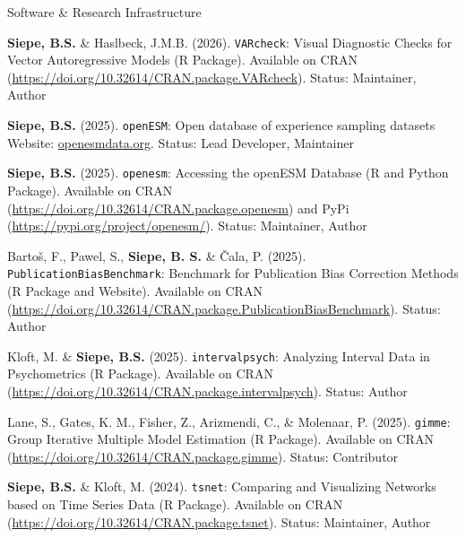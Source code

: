 \documentclass{resume} %
\begin{document}
\begin{rSection}{Software \& Research Infrastructure}
\begin{etaremune}

\item \textbf{Siepe, B.S.}  \& Haslbeck, J.M.B. (2026). \texttt{VARcheck}: Visual Diagnostic Checks for Vector Autoregressive Models (R Package). Available on CRAN (\url{https://doi.org/10.32614/CRAN.package.VARcheck}). Status: Maintainer, Author

\item \textbf{Siepe, B.S.} (2025). \texttt{openESM}: Open database of experience sampling datasets\\  Website: \href{https://openesmdata.org}{openesmdata.org}. Status: Lead Developer, Maintainer

\item \textbf{Siepe, B.S.} (2025). \texttt{openesm}: Accessing the openESM Database (R and Python Package). Available on CRAN (\url{https://doi.org/10.32614/CRAN.package.openesm}) and PyPi (\url{https://pypi.org/project/openesm/}). Status: Maintainer, Author

\item Bartoš, F., Pawel, S., \textbf{Siepe, B. S.} \& Čala, P. (2025). \texttt{PublicationBiasBenchmark}: Benchmark for Publication Bias Correction Methods (R Package and Website). Available on CRAN (\url{https://doi.org/10.32614/CRAN.package.PublicationBiasBenchmark}). Status: Author

\item Kloft, M. \& \textbf{Siepe, B.S.} (2025). \texttt{intervalpsych}: Analyzing Interval Data in Psychometrics (R Package). Available on CRAN (\url{https://doi.org/10.32614/CRAN.package.intervalpsych}). Status: Author

\item Lane, S., Gates, K. M., Fisher, Z., Arizmendi, C., \& Molenaar, P. (2025). \texttt{gimme}: Group Iterative Multiple Model Estimation (R Package). Available on CRAN (\url{https://doi.org/10.32614/CRAN.package.gimme}). Status: Contributor


\item \textbf{Siepe, B.S.} \& Kloft, M. (2024). \texttt{tsnet}: Comparing and Visualizing Networks based on Time Series Data (R Package). Available on CRAN (\url{https://doi.org/10.32614/CRAN.package.tsnet}). Status: Maintainer, Author

\end{etaremune}
\end{rSection}
\end{document}

